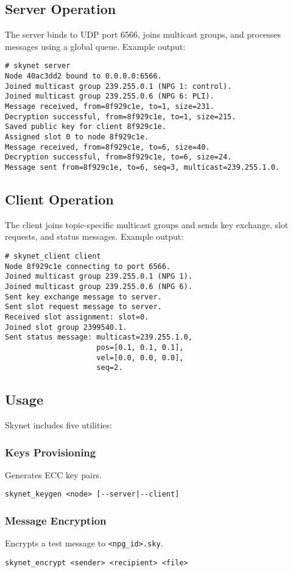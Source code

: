 \documentclass{article}
\begin{document}
\subsection{Server Operation}
The server binds to UDP port 6566, joins multicast groups, and processes messages using a global
queue. Example output:
\begin{lstlisting}
# skynet server
Node 40ac3dd2 bound to 0.0.0.0:6566.
Joined multicast group 239.255.0.1 (NPG 1: control).
Joined multicast group 239.255.0.6 (NPG 6: PLI).
Message received, from=8f929c1e, to=1, size=231.
Decryption successful, from=8f929c1e, to=1, size=215.
Saved public key for client 8f929c1e.
Assigned slot 0 to node 8f929c1e.
Message received, from=8f929c1e, to=6, size=40.
Decryption successful, from=8f929c1e, to=6, size=24.
Message sent from=8f929c1e, to=6, seq=3, multicast=239.255.1.0.
\end{lstlisting}

\subsection{Client Operation}
The client joins topic-specific multicast groups and sends key exchange, slot requests, and status
messages. Example output:
\begin{lstlisting}
# skynet_client client
Node 8f929c1e connecting to port 6566.
Joined multicast group 239.255.0.1 (NPG 1).
Joined multicast group 239.255.0.6 (NPG 6).
Sent key exchange message to server.
Sent slot request message to server.
Received slot assignment: slot=0.
Joined slot group 2399540.1.
Sent status message: multicast=239.255.1.0,
                     pos=[0.1, 0.1, 0.1],
                     vel=[0.0, 0.0, 0.0],
                     seq=2.
\end{lstlisting}

\newpage
\subsection{Usage}
Skynet includes five utilities:

\subsubsection*{Keys Provisioning}
Generates ECC key pairs.
\begin{lstlisting}
skynet_keygen <node> [--server|--client]
\end{lstlisting}

\subsubsection*{Message Encryption}
Encrypts a test message to \texttt{<npg\_id>.sky}.
\begin{lstlisting}
skynet_encrypt <sender> <recipient> <file>
\end{lstlisting}
\end{document}

